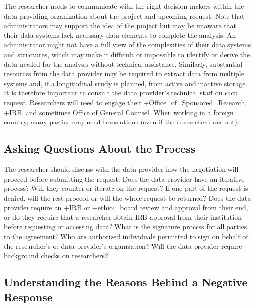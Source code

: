 \documentclass[
]{book}
\begin{document}
The researcher needs to communicate with the right decision-makers within the data providing organization about the project and upcoming request. Note that administrators may support the idea of the project but may be unaware that their data systems lack necessary data elements to complete the analysis. An administrator might not have a full view of the complexities of their data systems and structures, which may make it difficult or impossible to identify or derive the data needed for the analysis without technical assistance. Similarly, substantial resources from the data provider may be required to extract data from multiple systems and, if a longitudinal study is planned, from active and inactive storage. It is therefore important to consult the data provider's technical staff on each request. Researchers will need to engage their +Office\_of\_Sponsored\_Research\textbar, +IRB\textbar, and sometimes Office of General Counsel. When working in a foreign country, many parties may need translations (even if the researcher does not).

\hypertarget{asking-questions-about-the-process}{%
\subsection{Asking Questions About the Process}\label{asking-questions-about-the-process}}

The researcher should discuss with the data provider how the negotiation will proceed before submitting the request. Does the data provider have an iterative process? Will they counter or iterate on the request? If one part of the request is denied, will the rest proceed or will the whole request be returned? Does the data provider require an +IRB\textbar{} or +ethics\_board\textbar{} review and approval from their end, or do they require that a researcher obtain IRB approval from their institution before requesting or accessing data? What is the signature process for all parties to the agreement? Who are authorized individuals permitted to sign on behalf of the researcher's or data provider's organization? Will the data provider require background checks on researchers?

\hypertarget{understanding-the-reasons-behind-a-negative-response}{%
\subsection{Understanding the Reasons Behind a Negative Response}\label{understanding-the-reasons-behind-a-negative-response}}
\end{document}
